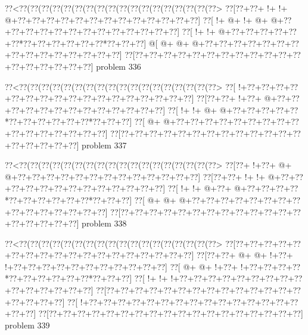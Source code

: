 \vbox{\vbox{\goo
\0??<\0??(\0??(\0??(\0??(\0??(\0??(\0??(\0??(\0??(\0??(\0??(\0??(\0??(\0??(\0??(\0??(\0??(\0??>
\0??[\0??+\0??+\- !+\- !+\- @+\0??+\0??+\0??+\0??+\0??+\0??+\0??+\0??+\0??+\0??+\0??+\0??+\0??]
\0??[\- !+\- @+\- !+\- @+\- @+\0??+\0??+\0??+\0??+\0??+\0??+\0??+\0??+\0??+\0??+\0??+\0??+\0??]
\0??[\- !+\- !+\- @+\0??+\0??+\0??+\0??+\0??+\0??*\0??+\0??+\0??+\0??+\0??+\0??*\0??+\0??+\0??]
\- @[\- @+\- @+\- @+\0??+\0??+\0??+\0??+\0??+\0??+\0??+\0??+\0??+\0??+\0??+\0??+\0??+\0??+\0??]
\0??[\0??+\0??+\0??+\0??+\0??+\0??+\0??+\0??+\0??+\0??+\0??+\0??+\0??+\0??+\0??+\0??+\0??+\0??]
}
\hfil problem 336\hfil\break
}



\vbox{\vbox{\goo
\0??<\0??(\0??(\0??(\0??(\0??(\0??(\0??(\0??(\0??(\0??(\0??(\0??(\0??(\0??(\0??(\0??(\0??(\0??>
\0??[\- !+\0??+\0??+\0??+\0??+\0??+\0??+\0??+\0??+\0??+\0??+\0??+\0??+\0??+\0??+\0??+\0??+\0??]
\0??[\0??+\0??+\- !+\0??+\- @+\0??+\0??+\0??+\0??+\0??+\0??+\0??+\0??+\0??+\0??+\0??+\0??+\0??]
\0??[\- !+\- !+\- @+\- @+\0??+\0??+\0??+\0??+\0??*\0??+\0??+\0??+\0??+\0??+\0??*\0??+\0??+\0??]
\0??[\- @+\- @+\0??+\0??+\0??+\0??+\0??+\0??+\0??+\0??+\0??+\0??+\0??+\0??+\0??+\0??+\0??+\0??]
\0??[\0??+\0??+\0??+\0??+\0??+\0??+\0??+\0??+\0??+\0??+\0??+\0??+\0??+\0??+\0??+\0??+\0??+\0??]
}
\hfil problem 337\hfil\break
}



\vbox{\vbox{\goo
\0??<\0??(\0??(\0??(\0??(\0??(\0??(\0??(\0??(\0??(\0??(\0??(\0??(\0??(\0??(\0??(\0??(\0??(\0??>
\0??[\0??+\- !+\0??+\- @+\- @+\0??+\0??+\0??+\0??+\0??+\0??+\0??+\0??+\0??+\0??+\0??+\0??+\0??]
\0??[\0??+\0??+\- !+\- !+\- @+\0??+\0??+\0??+\0??+\0??+\0??+\0??+\0??+\0??+\0??+\0??+\0??+\0??]
\0??[\- !+\- !+\- @+\0??+\- @+\0??+\0??+\0??+\0??*\0??+\0??+\0??+\0??+\0??+\0??*\0??+\0??+\0??]
\0??[\- @+\- @+\- @+\0??+\0??+\0??+\0??+\0??+\0??+\0??+\0??+\0??+\0??+\0??+\0??+\0??+\0??+\0??]
\0??[\0??+\0??+\0??+\0??+\0??+\0??+\0??+\0??+\0??+\0??+\0??+\0??+\0??+\0??+\0??+\0??+\0??+\0??]
}
\hfil problem 338\hfil\break
}



\vbox{\vbox{\goo
\0??<\0??(\0??(\0??(\0??(\0??(\0??(\0??(\0??(\0??(\0??(\0??(\0??(\0??(\0??(\0??(\0??(\0??(\0??>
\0??[\0??+\0??+\0??+\0??+\0??+\0??+\0??+\0??+\0??+\0??+\0??+\0??+\0??+\0??+\0??+\0??+\0??+\0??]
\0??[\0??+\0??+\- @+\- @+\- !+\0??+\- !+\0??+\0??+\0??+\0??+\0??+\0??+\0??+\0??+\0??+\0??+\0??]
\0??[\- @+\- @+\- !+\0??+\- !+\0??+\0??+\0??+\0??*\0??+\0??+\0??+\0??+\0??+\0??*\0??+\0??+\0??]
\0??[\- !+\- !+\- !+\0??+\0??+\0??+\0??+\0??+\0??+\0??+\0??+\0??+\0??+\0??+\0??+\0??+\0??+\0??]
\0??[\0??+\0??+\0??+\0??+\0??+\0??+\0??+\0??+\0??+\0??+\0??+\0??+\0??+\0??+\0??+\0??+\0??+\0??]
\0??[\- !+\0??+\0??+\0??+\0??+\0??+\0??+\0??+\0??+\0??+\0??+\0??+\0??+\0??+\0??+\0??+\0??+\0??]
\0??[\0??+\0??+\0??+\0??+\0??+\0??+\0??+\0??+\0??+\0??+\0??+\0??+\0??+\0??+\0??+\0??+\0??+\0??]
}
\hfil problem 339\hfil\break
}



